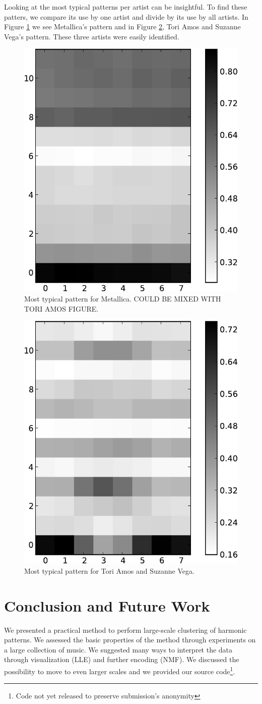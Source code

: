 \documentclass{article}
\begin{document}
Looking at the most typical patterns per artist can be insightful.
To find these patters, we compare its use by one artist and divide
by its use by all artists. In Figure \ref{fig:metallica} we see 
Metallica's pattern and in Figure \ref{fig:amosvega}, Tori Amos and
Suzanne Vega's pattern. These three artists were easily identified.

\begin{figure}[htb]
\begin{center}
\includegraphics[width=.4\columnwidth]{metallica_pattern}
\end{center}
\caption{\small{Most typical pattern for Metallica.
COULD BE MIXED WITH TORI AMOS FIGURE.
}}
\label{fig:metallica}
\end{figure}

\begin{figure}[htb]
\begin{center}
\includegraphics[width=.4\columnwidth]{toriamos_suzannevega_pattern}
\end{center}
\caption{\small{Most typical pattern for Tori Amos and Suzanne Vega.}}
\label{fig:amosvega}
\end{figure}



\section{Conclusion and Future Work}
We presented a practical method to perform large-scale clustering of
harmonic patterns. We assessed the basic properties of the method through
experiments on a large collection of music. We suggested many ways
to interpret the data through visualization (LLE) and further encoding
(NMF). We discussed the possibility to move to even larger scales
and we provided our source code\footnote{Code not yet released to preserve
submission's anonymity}.
\end{document}
